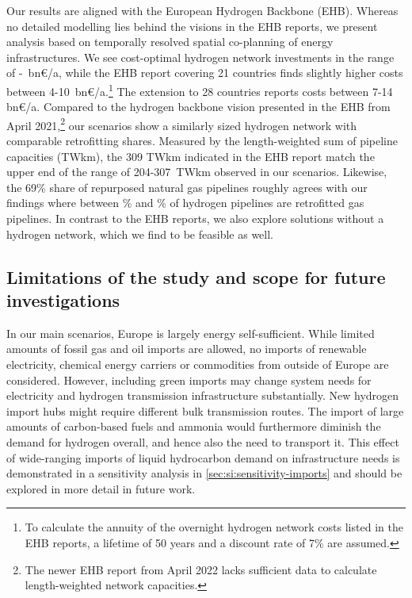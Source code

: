 Our results are aligned with the European Hydrogen Backbone
(EHB).\cite{gasforclimateEuropeanHydrogen2020,gasforclimateExtendingEuropean2021,gasforclimateEuropeanHydrogen2021,gasforclimateEuropeanHydrogen2022}
Whereas no detailed modelling lies behind the visions in the EHB reports, we
present analysis based on temporally resolved spatial co-planning of energy
infrastructures. We see cost-optimal hydrogen network investments in the range
of \minhycost-\maxhycost~bn\euro/a, while the EHB report covering 21 countries
finds slightly higher costs between
4-10~bn\euro/a.\cite{gasforclimateExtendingEuropean2021}\footnote{To calculate
the annuity of the overnight hydrogen network costs listed in the EHB reports, a
lifetime of 50 years and a discount rate of 7\% are assumed.} The extension to
28 countries reports costs between 7-14
bn\euro/a.\cite{gasforclimateEuropeanHydrogen2022} Compared to the hydrogen
backbone vision presented in the EHB from April
2021,\cite{gasforclimateExtendingEuropean2021}\footnote{The newer EHB report
from April 2022 \cite{gasforclimateEuropeanHydrogen2022} lacks sufficient data
to calculate length-weighted network capacities.} our scenarios show a
similarly sized hydrogen network with comparable retrofitting shares. Measured
by the length-weighted sum of pipeline capacities (TWkm), the 309 TWkm indicated
in the EHB report match the upper end of the range of 204-307~TWkm observed in
our scenarios. Likewise, the 69\% share of repurposed natural gas pipelines
\cite{gasforclimateExtendingEuropean2021} roughly agrees with our findings where
between \minretroshare\% and \maxretroshare\% of hydrogen pipelines are
retrofitted gas pipelines. In contrast to the EHB reports, we also explore
solutions without a hydrogen network, which we find to be feasible as well.

\subsection*{Limitations of the study and scope for future investigations}
\label{sec:limitations}

In our main scenarios, Europe is largely energy self-sufficient. While limited
amounts of fossil gas and oil imports are allowed, no imports of renewable
electricity, chemical energy carriers or commodities from outside of Europe are
considered. However, including green imports may change system needs for
electricity and hydrogen transmission infrastructure substantially. New hydrogen
import hubs might require different bulk transmission routes. The import of
large amounts of carbon-based fuels and ammonia would furthermore diminish the
demand for hydrogen overall, and hence also the need to transport it. This
effect of wide-ranging imports of liquid hydrocarbon demand on infrastructure
needs is demonstrated in a sensitivity analysis in
\cref{sec:si:sensitivity-imports} and should be explored in more detail in
future work.
\cite{fasihiTechnoeconomicAssessment2019,heuserTechnoeconomicAnalysis2019,hamppImportOptions2023}


